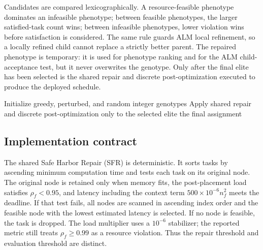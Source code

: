 Candidates are compared lexicographically. A resource-feasible phenotype dominates an infeasible phenotype; between feasible phenotypes, the larger satisfied-task count wins; between infeasible phenotypes, lower violation wins before satisfaction is considered. The same rule guards ALM local refinement, so a locally refined child cannot replace a strictly better parent. The repaired phenotype is temporary: it is used for phenotype ranking and for the ALM child-acceptance test, but it never overwrites the genotype. Only after the final elite has been selected is the shared repair and discrete post-optimization executed to produce the deployed schedule.

\begin{algorithm}[t]
\caption{Outcome-Aligned M-CA-ALM}
\label{alg:mca_official}
\SetAlgoLined
{}
Initialize greedy, perturbed, and random integer genotypes\;
Apply shared repair and discrete post-optimization only to the selected elite\;
\Return the final assignment\;
\end{algorithm}

\subsection{Implementation contract}
The shared Safe Harbor Repair (SFR) is deterministic. It sorts tasks by ascending minimum computation time and tests each task on its original node. The original node is retained only when memory fits, the post-placement load satisfies $\rho_f<0.95$, and latency including the context term $500\times10^{-6}n_f^2$ meets the deadline. If that test fails, all nodes are scanned in ascending index order and the feasible node with the lowest estimated latency is selected. If no node is feasible, the task is dropped. The load multiplier uses a $10^{-6}$ stabilizer; the reported metric still treats $\rho_f\geq0.99$ as a resource violation. Thus the repair threshold and evaluation threshold are distinct.

